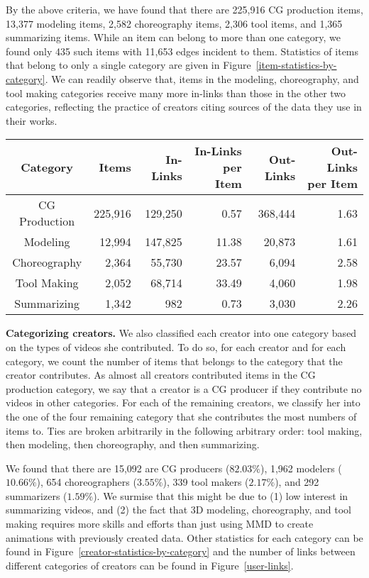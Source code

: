 \documentclass[10pt, a4paper]{article}
\begin{document}
By the above criteria, we have found that there are 225,916 CG production items, 13,377 modeling items, 2,582 choreography items, 2,306 tool items, and 1,365 summarizing items. While an item can belong to more than one category, we found only 435 such items with 11,653 edges incident to them. Statistics of items that belong to only a single category are given in Figure~\ref{item-statistics-by-category}. We can readily observe that, items in the modeling, choreography, and tool making categories receive many more in-links than those in the other two categories, reflecting the practice of creators citing sources of the data they use in their works.\medskip
\begin{figure*}[t]
	\centering
	\begin{tabular}{c|r|r|r|r|r}
		Category & Items & In-Links & In-Links per Item & Out-Links & Out-Links per Item \\
		\hline
		CG Production & 225,916 & 129,250 & 0.57 & 368,444 & 1.63\\
		Modeling & 12,994 & 147,825 & 11.38 & 20,873 & 1.61\\
		Choreography & 2,364 & 55,730 & 23.57 & 6,094 & 2.58\\
		Tool Making & 2,052 & 68,714 & 33.49 & 4,060 & 1.98\\
		Summarizing & 1,342 & 982 & 0.73 & 3,030 & 2.26
	\end{tabular}
	\caption{Statistics of items that belong to only one category. Links were counted ignoring those between items uploaded by the same creator.}
	\label{item-statistics-by-category}
\end{figure*}

{\bf Categorizing creators.} We also classified each creator into one category based on the types of videos she contributed. To do so, for each creator and for each category, we count the number of items that belongs to the category that the creator contributes. As almost all creators contributed items in the CG production category, we say that a creator is a CG producer if they contribute no videos in other categories. For each of the remaining creators, we classify her into the one of the four remaining category that she contributes the most numbers of items to. Ties are broken arbitrarily in the following arbitrary order: tool making, then modeling, then choreography, and then summarizing.

We found that there are 15,092 are CG producers ($82.03\%$), 1,962 modelers ($10.66\%$), 654 choreographers ($3.55\%$), 339 tool makers ($2.17\%$), and 292 summarizers ($1.59\%$). We surmise that this might be due to (1) low interest in summarizing videos, and (2) the fact that 3D modeling, choreography, and tool making requires more skills and efforts than just using MMD to create animations with previously created data. Other statistics for each category can be found in Figure~\ref{creator-statistics-by-category} and the number of links between different categories of creators can be found in Figure~\ref{user-links}.
\end{document}
